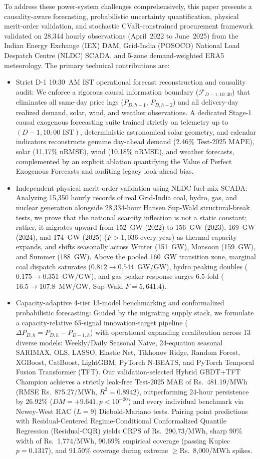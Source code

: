 \documentclass[journal,10pt,twocolumn]{IEEEtran}
\begin{document}
To address these power-system challenges comprehensively, this paper presents a causality-aware forecasting, probabilistic uncertainty quantification, physical merit-order validation, and stochastic CVaR-constrained procurement framework validated on 28,344 hourly observations (April~2022 to June~2025) from the Indian Energy Exchange (IEX) DAM, Grid-India (POSOCO) National Load Despatch Centre (NLDC) SCADA, and 5-zone demand-weighted ERA5 meteorology. The primary technical contributions are:
\begin{itemize}
    \item Strict D-1 10:30~AM IST operational forecast reconstruction and causality audit: We enforce a rigorous causal information boundary ($\mathcal{F}_{D-1, 10:30}$) that eliminates all same-day price lags ($P_{D,h-1}$, $P_{D,h-2}$) and all delivery-day realized demand, solar, wind, and weather observations. A dedicated Stage-1 causal exogenous forecasting suite trained strictly on telemetry up to $(D-1, 10:00\text{~IST})$, deterministic astronomical solar geometry, and calendar indicators reconstructs genuine day-ahead demand (2.46\% Test-2025 MAPE), solar (11.17\% nRMSE), wind (10.18\% nRMSE), and weather forecasts, complemented by an explicit ablation quantifying the Value of Perfect Exogenous Forecasts and auditing legacy look-ahead bias.
    \item Independent physical merit-order validation using NLDC fuel-mix SCADA: Analyzing 15,350 hourly records of real Grid-India coal, hydro, gas, and nuclear generation alongside 28,334-hour Hansen Sup-Wald structural-break tests, we prove that the national scarcity inflection is not a static constant; rather, it migrates upward from 152~GW (2022) to 156~GW (2023), 169~GW (2024), and 174~GW (2025) ($F > 1,036$ every year) as thermal capacity expands, and shifts seasonally across Winter (151~GW), Monsoon (159~GW), and Summer (188~GW). Above the pooled 160~GW transition zone, marginal coal dispatch saturates ($0.812 \to 0.544$~GW/GW), hydro peaking doubles ($0.175 \to 0.351$~GW/GW), and gas peaker response surges 6.5-fold ($16.5 \to 107.8$~MW/GW, Sup-Wald $F = 5,641.4$).
    \item Capacity-adaptive 4-tier 13-model benchmarking and conformalized probabilistic forecasting: Guided by the migrating supply stack, we formulate a capacity-relative 65-signal innovation-target pipeline ($\Delta P_{D,h} = P_{D,h} - P_{D-1,h}$) with operational expanding recalibration across 13 diverse models: Weekly/Daily Seasonal Naive, 24-equation seasonal SARIMAX, OLS, LASSO, Elastic Net, Tikhonov Ridge, Random Forest, XGBoost, CatBoost, LightGBM, PyTorch N-BEATS, and PyTorch Temporal Fusion Transformer (TFT). Our validation-selected Hybrid GBDT+TFT Champion achieves a strictly leak-free Test-2025 MAE of Rs.~481.19/MWh (RMSE Rs.~875.27/MWh, $R^2 = 0.8942$), outperforming 24-hour persistence by 26.92\% ($DM = +9.641, p < 10^{-20}$) and every individual benchmark via Newey-West HAC ($L=9$) Diebold-Mariano tests. Pairing point predictions with Residual-Centered Regime-Conditional Conformalized Quantile Regression (Residual-CQR) yields CRPS of Rs.~290.73/MWh, sharp 90\% width of Rs.~1,774/MWh, 90.69\% empirical coverage (passing Kupiec $p = 0.1317$), and 91.50\% coverage during extreme $\ge$Rs.~8,000/MWh spikes.

\end{itemize}
\end{document}

